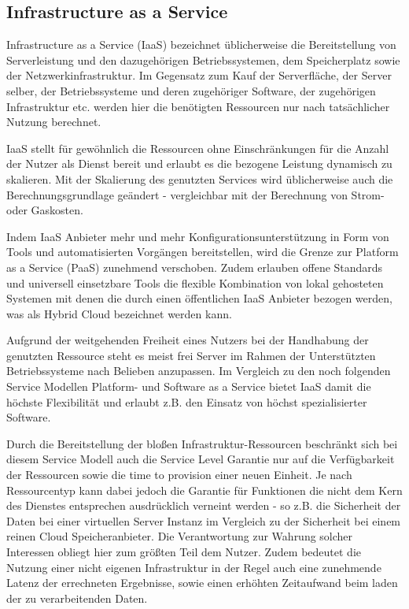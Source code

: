  
\subsection{Infrastructure as a Service}
Infrastructure as a Service (IaaS) bezeichnet üblicherweise die Bereitstellung von Serverleistung und den dazugehörigen Betriebssystemen, dem Speicherplatz sowie der Netzwerkinfrastruktur. Im Gegensatz zum Kauf der Serverfläche, der Server selber, der Betriebssysteme und deren zugehöriger Software, der zugehörigen Infrastruktur etc. werden hier die benötigten Ressourcen nur nach tatsächlicher Nutzung berechnet.

IaaS stellt für gewöhnlich die Ressourcen ohne Einschränkungen für die Anzahl der Nutzer als Dienst bereit und erlaubt es die bezogene Leistung dynamisch zu skalieren. Mit der Skalierung des genutzten Services wird üblicherweise auch die Berechnungsgrundlage geändert - vergleichbar mit der Berechnung von Strom- oder Gaskosten.

Indem IaaS Anbieter mehr und mehr Konfigurationsunterstützung in Form von Tools und automatisierten Vorgängen bereitstellen, wird die Grenze zur Platform as a Service (PaaS) zunehmend verschoben. Zudem erlauben offene Standards und universell einsetzbare Tools die flexible Kombination von lokal gehosteten Systemen mit denen die durch einen öffentlichen IaaS Anbieter bezogen werden, was als Hybrid Cloud bezeichnet werden kann. \cite{technet}

Aufgrund der weitgehenden Freiheit eines Nutzers bei der Handhabung der genutzten Ressource steht es meist frei Server im Rahmen der Unterstützten Betriebssysteme nach Belieben anzupassen. Im Vergleich zu den noch folgenden Service Modellen Platform- und Software as a Service bietet IaaS damit die höchste Flexibilität und erlaubt z.B. den Einsatz von höchst spezialisierter Software.

Durch die Bereitstellung der bloßen Infrastruktur-Ressourcen beschränkt sich bei diesem Service Modell auch die Service Level Garantie nur auf die Verfügbarkeit der Ressourcen sowie die time to provision einer neuen Einheit. Je nach Ressourcentyp kann dabei jedoch die Garantie für Funktionen die nicht dem Kern des Dienstes entsprechen ausdrücklich verneint werden - so z.B. die Sicherheit der Daten bei einer virtuellen Server Instanz im Vergleich zu der Sicherheit bei einem reinen Cloud Speicheranbieter. Die Verantwortung zur Wahrung solcher Interessen obliegt hier zum größten Teil dem Nutzer. Zudem bedeutet die Nutzung einer nicht eigenen Infrastruktur in der Regel auch eine zunehmende Latenz der errechneten Ergebnisse, sowie einen erhöhten Zeitaufwand beim laden der zu verarbeitenden Daten.

